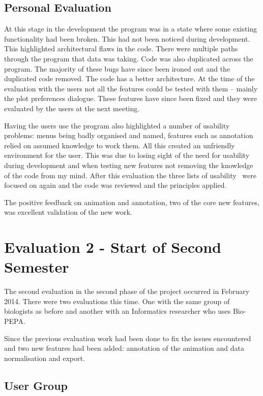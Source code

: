 \subsection{Personal Evaluation}

At this stage in the development the program was in a state where some existing functionality had been broken.  This had not been noticed during development.  This highlighted architectural flaws in the code.  There were multiple paths through the program that data was taking.  Code was also duplicated across the program.  The majority of these bugs have since been ironed out and the duplicated code removed. The code has a better architecture.  At the time of the evaluation with the users not all the features could be tested with them -- mainly the plot preferences dialogue.  These features have since been fixed and they were evaluated by the users at the next meeting.

Having the users use the program also highlighted a number of usability problems: menus being badly organised and named, features such as annotation relied on assumed knowledge to work them.  All this created an unfriendly environment for the user.  This was due to losing sight of the need for usability during development and when testing new features not removing the knowledge of the code from my mind.  After this evaluation the three lists of usability~\cite{shgold}\cite{normsev}\cite{neilten} were focused on again and the code was reviewed and the principles applied.

The positive feedback on animation and annotation, two of the core new features, was excellent validation of the new work.

\section{Evaluation 2 - Start of Second Semester}

The second evaluation in the second phase of the project occurred in February 2014.  There were two evaluations this time.  One with the same group of biologists as before and another with an Informatics researcher who uses Bio-PEPA.

Since the previous evaluation work had been done to fix the issues encountered and two new features had been added: annotation of the animation and data normalisation and export.

\subsection{User Group}

